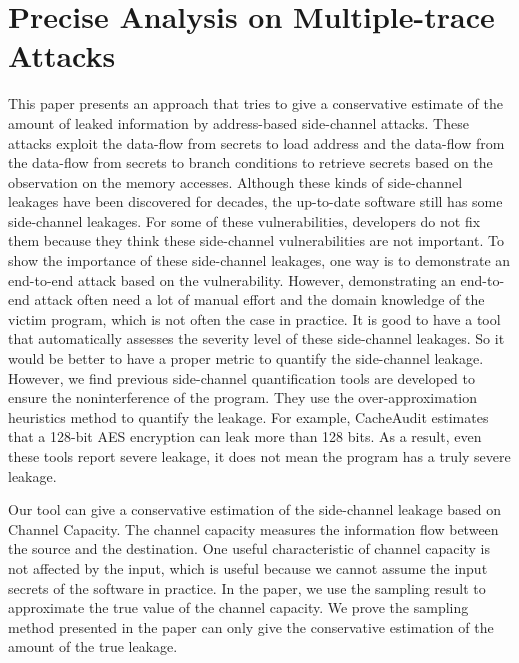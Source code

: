 \section{Precise Analysis on Multiple-trace Attacks}
This paper presents an approach that tries to give a conservative
estimate of the amount of leaked information by address-based
side-channel attacks. These attacks exploit the data-flow from secrets
to load address and the data-flow from the data-flow from secrets to
branch conditions to retrieve secrets based on the observation on the
memory accesses. Although these kinds of side-channel leakages have
been discovered for decades, the up-to-date software still has some
side-channel leakages. For some of these vulnerabilities, developers
do not fix them because they think these side-channel vulnerabilities
are not important. To show the importance of these side-channel
leakages, one way is to demonstrate an end-to-end attack based on the
vulnerability. However, demonstrating an end-to-end attack often need
a lot of manual effort and the domain knowledge of the victim program,
which is not often the case in practice. It is good to have a tool
that automatically assesses the severity level of these side-channel
leakages. So it would be better to have a proper metric to quantify
the side-channel leakage. However, we find previous side-channel
quantification tools are developed to ensure the noninterference of
the program. They use the over-approximation heuristics method to
quantify the leakage. For example, CacheAudit estimates that a 128-bit
AES encryption can leak more than 128 bits. As a result, even these
tools report severe leakage, it does not mean the program has a truly
severe leakage.

Our tool can give a conservative estimation of the
side-channel leakage based on Channel Capacity. The channel capacity
measures the information flow between the source and the
destination. One useful characteristic of channel capacity is not
affected by the input, which is useful because we cannot
assume the input secrets of the software in practice. In the paper, we
use the sampling result to approximate the true value of the
channel capacity. We prove the sampling method presented in the paper can only give the conservative estimation of the amount of the true leakage.

